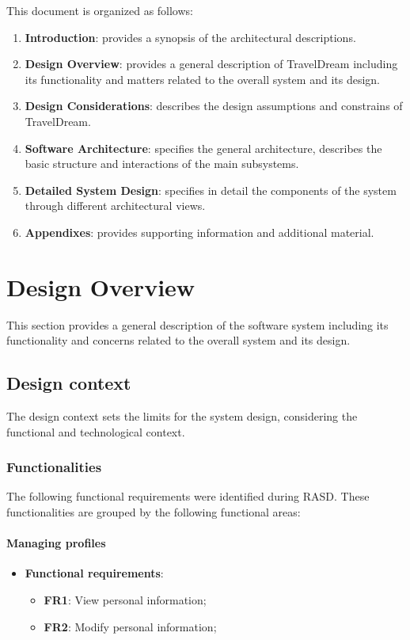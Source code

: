 \documentclass[a4paper,12pt]{book}
\begin{document}
This document is organized as follows:
\begin{enumerate}
  \item \textbf{Introduction}: provides a synopsis of the architectural descriptions.
  \item \textbf{Design Overview}: provides a general description of TravelDream including its functionality and matters related to the overall system and its design.
  \item \textbf{Design Considerations}: describes the design assumptions and constrains of TravelDream.
  \item \textbf{Software Architecture}: specifies the general architecture, describes the basic structure and interactions of the main subsystems.
  \item \textbf{Detailed System Design}: specifies in detail the components of the system through different architectural views.
  \item \textbf{Appendixes}: provides supporting information and additional material.
\end{enumerate}

\chapter{Design Overview}
This section provides a general description of the software system including its functionality and concerns related to the overall system and its design.

\section{Design context}
The design context sets the limits for the system design, considering the functional and technological context.

\subsection{Functionalities}
The following functional requirements were identified during RASD. These functionalities are grouped by the following functional areas:

\subsubsection{Managing profiles}
\begin{itemize}
  \item \textbf{Functional requirements}:
  \begin{itemize}[noitemsep]
    \item \textbf{FR1}: View personal information;
    \item \textbf{FR2}: Modify personal information;
  \end{itemize}
\end{itemize}
\end{document}
